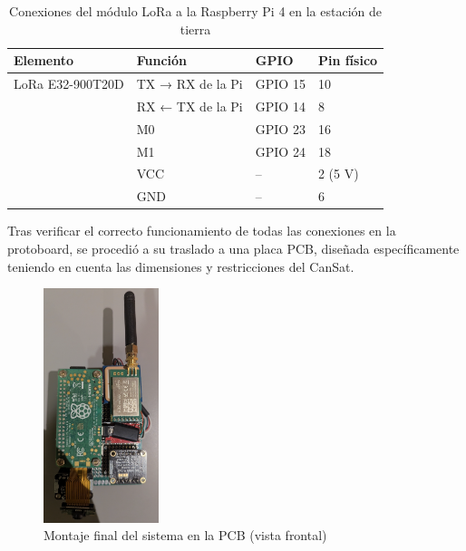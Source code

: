 \begin{table}[H]
    \centering
    \renewcommand{\arraystretch}{1.2}
    \begin{tabular}{|l|l|l|l|}
        \hline
        \textbf{Elemento} & \textbf{Función} & \textbf{GPIO} & \textbf{Pin físico} \\ \hline
        LoRa E32-900T20D  & TX → RX de la Pi & GPIO 15       & 10                  \\ \cline{2-4}
        & RX ← TX de la Pi & GPIO 14       & 8                   \\ \cline{2-4}
        & M0               & GPIO 23       & 16                  \\ \cline{2-4}
        & M1               & GPIO 24       & 18                  \\ \cline{2-4}
        & VCC              & --            & 2 (5 V)             \\ \cline{2-4}
        & GND              & --            & 6                   \\ \hline
    \end{tabular}
    \caption{Conexiones del módulo LoRa a la Raspberry Pi 4 en la estación de tierra}
    \label{tab:conexiones_ground_pi4}
\end{table}


Tras verificar el correcto funcionamiento de todas las conexiones en la protoboard, se procedió a su traslado a una placa PCB,
diseñada específicamente teniendo en cuenta las dimensiones y restricciones del CanSat.

\begin{figure}[H]
    \centering
    \includegraphics[width=0.3\textwidth]{Imagenes/Bitmap/pcb_montaje_frontal}
    \caption{Montaje final del sistema en la PCB (vista frontal)}
    \label{fig:pcb_montaje_frontal}
\end{figure}

